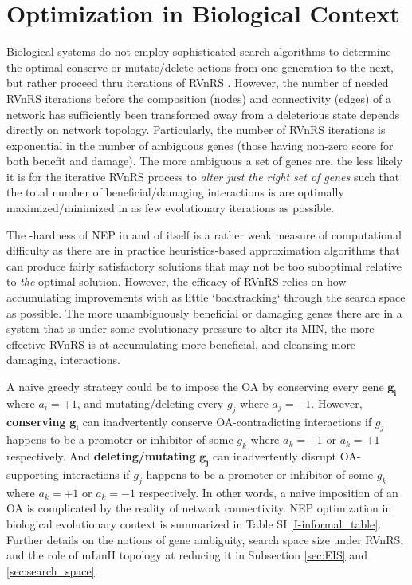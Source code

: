 \section{Optimization in Biological Context}\label{opt_in_bio_context}
    Biological systems do not employ sophisticated search algorithms to determine the optimal conserve or mutate/delete actions from one generation to the next, but rather proceed thru iterations of RVnRS \cite{carvunis_proto-genes_2012}. However, the number of needed RVnRS iterations before the composition (nodes) and connectivity (edges) of a network has sufficiently been transformed away from a deleterious state depends directly on network topology.
    Particularly, the number of RVnRS iterations is exponential in the number of ambiguous genes (those having non-zero score for both benefit and damage).
    The more ambiguous a set of genes are, the less likely it is for the iterative RVnRS process to \textit{alter just the right set of genes} such that the total number of beneficial/damaging interactions is are optimally maximized/minimized in as few evolutionary iterations as possible.

    The -hardness of NEP in and of itself is a rather weak measure of computational difficulty as there are in practice heuristics-based approximation algorithms that can produce fairly satisfactory solutions that may not be too suboptimal relative to \textit{the} optimal solution.
    However, the efficacy of RVnRS relies on how accumulating improvements with as little `backtracking` through the search space as possible. The more unambiguously beneficial or damaging genes there are in a system that is under some evolutionary pressure to alter its MIN, the more effective RVnRS is at accumulating more beneficial, and cleansing more damaging, interactions.

    A naive greedy strategy could be to impose the OA by conserving every gene $\boldsymbol{g_i}$ where $a_i = +1$, and mutating/deleting every $g_j$ where $a_j=-1$. However, \textbf{conserving} $\boldsymbol{g_i}$ can inadvertently conserve OA-contradicting interactions if $g_j$ happens to be a promoter or inhibitor of some $g_k$ where $a_k=-1$ or $a_k=+1$ respectively. And \textbf{deleting/mutating} $\boldsymbol{g_j}$ can inadvertently disrupt OA-supporting interactions if $g_j$ happens to be a promoter or inhibitor of some $g_k$ where $a_k=+1$ or $a_k=-1$ respectively. In other words, a naive imposition of an OA is complicated by the reality of network connectivity. NEP optimization in biological evolutionary context is summarized in Table SI \ref{I-informal_table}. Further details on the notions of gene ambiguity, search space size under RVnRS, and the role of mLmH topology at reducing it in Subsection \ref{sec:EIS} and \ref{sec:search_space}.
